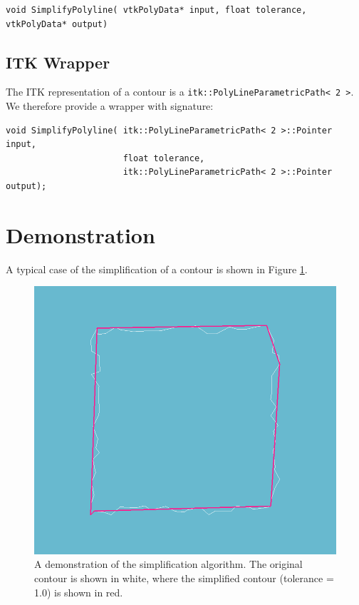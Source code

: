\documentclass{InsightArticle}
\begin{document}
\begin{verbatim}
void SimplifyPolyline( vtkPolyData* input, float tolerance, vtkPolyData* output)
\end{verbatim}

\subsection{ITK Wrapper}
The ITK representation of a contour is a \verb|itk::PolyLineParametricPath< 2 >|. We therefore provide a wrapper with signature:

\begin{verbatim}
void SimplifyPolyline( itk::PolyLineParametricPath< 2 >::Pointer input, 
                       float tolerance, 
                       itk::PolyLineParametricPath< 2 >::Pointer output);
\end{verbatim}

\section{Demonstration}

A typical case of the simplification of a contour is shown in Figure \ref{fig:Demo}.

\begin{figure}[H]
  \centering
  \includegraphics[width=0.3\linewidth]{images/demo}
  \caption{A demonstration of the simplification algorithm. The original contour is shown in white, where the simplified contour (tolerance = 1.0) is shown in red.}
  \label{fig:Demo}
\end{figure}
\end{document}
